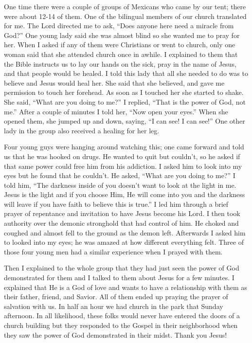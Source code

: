 \documentclass[oneside]{book}
\begin{document}
One time there were a couple of groups of Mexicans who came by our tent; there were about 12-14 of them. One of the bilingual members of our church translated for me. The Lord directed me to ask, “Does anyone here need a miracle from God?” One young lady said she was almost blind so she wanted me to pray for her. When I asked if any of them were Christians or went to church, only one woman said that she attended church once in awhile. I explained to them that the Bible instructs us to lay our hands on the sick, pray in the name of Jesus, and that people would be healed. I told this lady that all she needed to do was to believe and Jesus would heal her. She said that she believed, and gave me permission to touch her forehead. As soon as I touched her she started to shake. She said, “What are you doing to me?” I replied, “That is the power of God, not me.” After a couple of minutes I told her, “Now open your eyes.” When she opened them, she jumped up and down, saying, “I can see! I can see!” One other lady in the group also received a healing for her leg. 

Four young guys were hanging around watching this; one came forward and told us that he was hooked on drugs. He wanted to quit but couldn’t, so he asked if that same power could free him from his addiction. I asked him to look into my eyes but he found that he couldn’t. He asked, “What are you doing to me?” I told him, “The darkness inside of you doesn’t want to look at the light in me. Jesus is the light and if you choose Him, He will come into you and the darkness will leave if you have faith to believe this is true.” I led him through a brief prayer of repentance and invitation to have Jesus become his Lord. I then took authority over the demonic stronghold that had control of him. He choked and coughed and almost fell to the ground as the demon left. Afterwards I asked him to looked into my eyes; he was amazed at how different everything felt. Three of those four young men had a similar experience when I prayed with them.

Then I explained to the whole group that they had just seen the power of God demonstrated for them and I talked to them about Jesus for a few minutes. I explained that He is a God of love and wants to have a relationship with them as their father, friend, and Savior. All of them ended up praying the prayer of salvation with us. In half an hour we had church in the park that Sunday afternoon. In all likelihood, these folks would never have entered the doors of a church building but they responded to the Gospel in their neighborhood when they saw the power of God demonstrated in their midst. Thank you Jesus!
\end{document}
